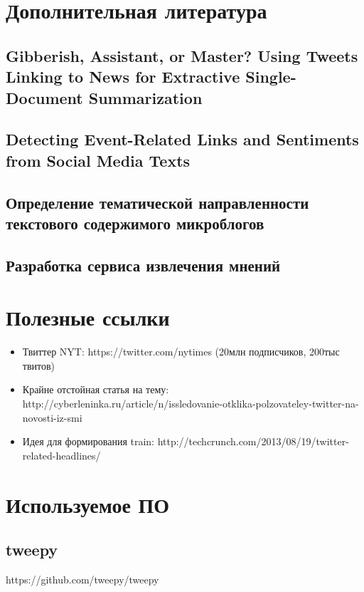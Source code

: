
\section{Дополнительная литература}
    \subsection{Gibberish, Assistant, or Master? Using Tweets Linking to News for Extractive Single-Document Summarization}
    \subsection{Detecting Event-Related Links and Sentiments from Social Media Texts}
    \subsection{Определение тематической направленности текстового содержимого микроблогов}
    \subsection{Разработка сервиса извлечения мнений}
    

\section{Полезные ссылки}
    \begin{itemize}
        \item Твиттер NYT: https://twitter.com/nytimes (20млн подписчиков, 200тыс твитов)
        \item Крайне отстойная статья на тему: http://cyberleninka.ru/article/n/issledovanie-otklika-polzovateley-twitter-na-novosti-iz-smi
        \item Идея для формирования train: http://techcrunch.com/2013/08/19/twitter-related-headlines/
    \end{itemize}
\clearpage


            


\section{Используемое ПО}
    \subsection{tweepy}
        https://github.com/tweepy/tweepy